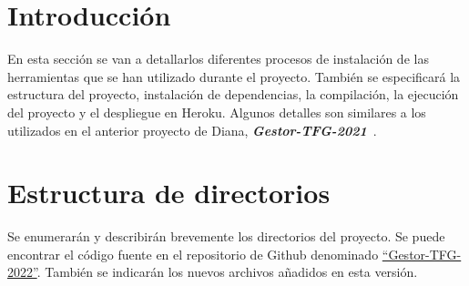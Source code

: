 
\section{Introducción}
En esta sección se van a detallarlos diferentes procesos de instalación de las herramientas que se han utilizado durante el proyecto. También se especificará la estructura del proyecto, instalación de dependencias, la compilación, la ejecución del proyecto y el despliegue en Heroku. 
Algunos detalles son similares a los utilizados en el anterior proyecto de Diana, \textbf{\textit{Gestor-TFG-2021}}~\cite{Gestor-TFG-2021}.

\section{Estructura de directorios}
Se enumerarán y describirán brevemente los directorios del proyecto. Se puede encontrar el código fuente en el repositorio de Github denominado \href{https://github.com/drg1006/gestor-tfg-2022}{``Gestor-TFG-2022''}. También se indicarán los nuevos archivos añadidos en esta versión.

